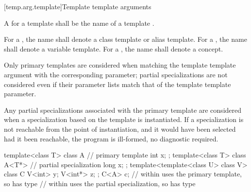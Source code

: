 \documentclass{wg21}
\begin{document}
[temp.arg.template]{Template template arguments}

\pnum A
for a template
shall be the name of a  template .

\begin{addedblock}
For a , the name shall denote a class template or alias template. For a , the name shall denote a variable template. For a , the name shall denote a concept.
\end{addedblock}

Only primary templates are considered when matching the template template
argument with the corresponding parameter; partial specializations are not
considered even if their parameter lists match that of the template template
parameter.

\pnum
Any partial specializations  associated with the
primary template are considered when a
specialization based on the template
is instantiated.
If a specialization is not reachable from the point of instantiation,
and it would have been selected had it been reachable, the program is ill-formed,
no diagnostic required.
\begin{example}
    \begin{codeblock}
        template<class T> class A {     // primary template
            int x;
        };
        template<class T> class A<T*> { // partial specialization
            long x;
        };
        template<template<class U> class V> class C {
            V<int>  y;
            V<int*> z;
        };
        C<A> c;             //  within  uses the primary template, so  has type 
        //  within  uses the partial specialization, so  has type 
    \end{codeblock}
\end{example}
\end{document}
